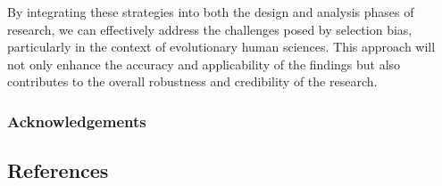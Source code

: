 \documentclass[
  singlecolumn,
  9pt]{article}
\begin{document}
By integrating these strategies into both the design and analysis phases
of research, we can effectively address the challenges posed by
selection bias, particularly in the context of evolutionary human
sciences. This approach will not only enhance the accuracy and
applicability of the findings but also contributes to the overall
robustness and credibility of the research.

\subsubsection{Acknowledgements}\label{acknowledgements}

\subsection*{References}\label{references}
\end{document}

